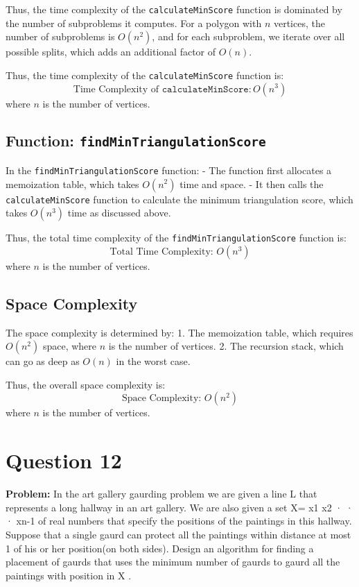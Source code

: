\documentclass[a4paper,12pt]{report}
\begin{document}
Thus, the time complexity of the \texttt{calculateMinScore} function is dominated by the number of subproblems it computes. For a polygon with \(n\) vertices, the number of subproblems is \(O(n^2)\), and for each subproblem, we iterate over all possible splits, which adds an additional factor of \(O(n)\).

Thus, the time complexity of the \texttt{calculateMinScore} function is:
\[
\text{Time Complexity of } \texttt{calculateMinScore}: O(n^3)
\]
where \(n\) is the number of vertices.

\subsection*{Function: \texttt{findMinTriangulationScore}}

In the \texttt{findMinTriangulationScore} function:
- The function first allocates a memoization table, which takes \(O(n^2)\) time and space.
- It then calls the \texttt{calculateMinScore} function to calculate the minimum triangulation score, which takes \(O(n^3)\) time as discussed above.

Thus, the total time complexity of the \texttt{findMinTriangulationScore} function is:
\[
\text{Total Time Complexity: } O(n^3)
\]
where \(n\) is the number of vertices.

\subsection*{Space Complexity}

The space complexity is determined by:
1. The memoization table, which requires \(O(n^2)\) space, where \(n\) is the number of vertices.
2. The recursion stack, which can go as deep as \(O(n)\) in the worst case.

Thus, the overall space complexity is:
\[
\text{Space Complexity: } O(n^2)
\]
where \(n\) is the number of vertices.

\newpage
\section*{Question 12}

\textbf{Problem:}
In the art gallery gaurding problem we are given a line L that represents a long hallway in an art gallery. We are also given a set X= x1 x2 · · · xn-1 of real numbers that specify the positions of the paintings in this hallway. Suppose that a single gaurd can protect all the paintings within distance at most 1 of his or her position(on both sides). Design an algorithm for finding a placement of gaurds that uses the minimum number of gaurds to gaurd all the paintings with position in X .
\end{document}
